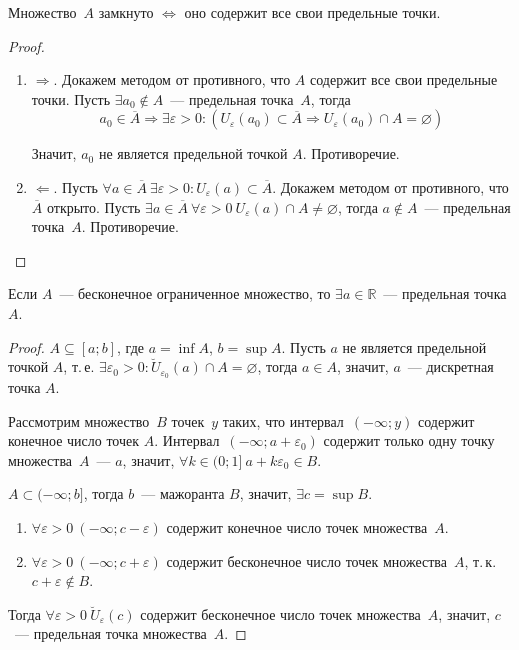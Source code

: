 \begin{statement}
Множество~$A$ замкнуто $\Leftrightarrow$ оно содержит все свои предельные точки.
\end{statement}
\begin{proof}
\begin{enumerate}
	\item $\Rightarrow$. Докажем методом от противного, что $A$ содержит все свои предельные точки.
	Пусть $\exists a_0 \notin A$~--- предельная точка~$A$, тогда
	\begin{equation*}
	a_0 \in \overline A \Rightarrow \exists \varepsilon > 0 \colon (U_\varepsilon(a_0) \subset \overline A \Rightarrow U_\varepsilon(a_0) \cap A = \varnothing)
	\end{equation*}
	
	Значит, $a_0$ не является предельной точкой $A$.
	Противоречие.
	
	\item $\Leftarrow$. Пусть $\forall a \in \overline A \ \exists \varepsilon > 0 \colon U_\varepsilon(a) \subset \overline A$.
	Докажем методом от противного, что $\overline A$ открыто.
	Пусть $\exists a \in \overline A \ \forall \varepsilon > 0 \ U_\varepsilon(a) \cap A \neq \varnothing$, тогда $a \notin A$~--- предельная точка~$A$.
	Противоречие.
\end{enumerate}
\end{proof}

\begin{theorem}[Вейерштрасса]
\label{th:Weierstrass}
Если $A$~--- бесконечное ограниченное множество, то $\exists a \in \mathbb R$~--- предельная точка $A$.
\end{theorem}
\begin{proof}
$A \subseteq [a; b]$, где $a = \inf A$, $b = \sup A$.
Пусть $a$ не является предельной точкой $A$, т.\,е. $\exists \varepsilon_0 > 0 \colon \breve U_{\varepsilon_0}(a) \cap A = \varnothing$, тогда $a \in A$, значит, $a$~--- дискретная точка $A$.

Рассмотрим множество~$B$ точек~$y$ таких, что интервал~$(-\infty; y)$ содержит конечное число точек $A$.
Интервал~$(-\infty; a + \varepsilon_0)$ содержит только одну точку множества~$A$~--- $a$, значит, $\forall k \in (0; 1] \ a + k\varepsilon_0 \in B$.

$A \subset (-\infty; b]$, тогда $b$~--- мажоранта $B$, значит, $\exists c = \sup B$.
\begin{enumerate}
	\item $\forall \varepsilon > 0 \ (-\infty; c - \varepsilon)$ содержит конечное число точек множества~$A$.
	\item $\forall \varepsilon > 0 \ (-\infty; c + \varepsilon)$ содержит бесконечное число точек множества~$A$, т.\,к. $c + \varepsilon \notin B$.
\end{enumerate}

Тогда $\forall \varepsilon > 0 \ \breve U_\varepsilon(c)$ содержит бесконечное число точек множества~$A$, значит, $c$~--- предельная точка множества~$A$.
\end{proof}